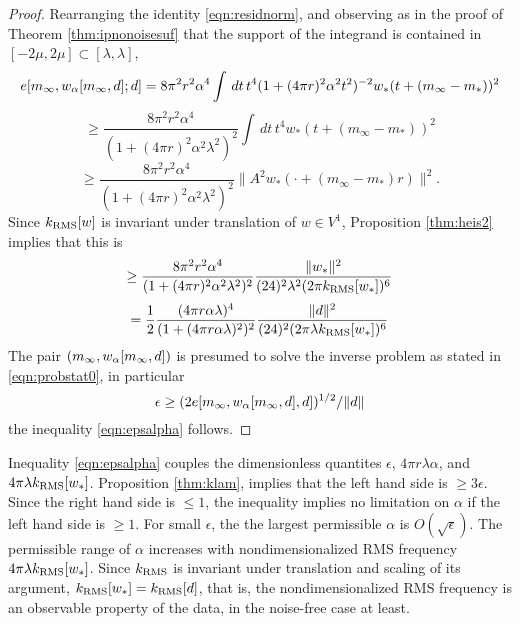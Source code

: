 \begin{proof}
  Rearranging the identity \ref{eqn:residnorm}, and observing as in
  the proof of Theorem \ref{thm:ipnonoisesuf} that the support of the
  integrand is contained in $[-2\mu, 2\mu] \subset [\lambda,\lambda]$,
  \[
  e[m_{\infty},w_{\alpha}[m_{\infty},d];d] 
= 8 \pi^2 r^2 \alpha^4\int\,dt\,t^4(1+(4\pi r)^2 \alpha^2 t^2)^{-2}w_*(t+(m_{\infty}-m_*))^2
\]
\[
  \ge \frac{8\pi^2r^2\alpha^4}{(1+(4\pi r)^2 \alpha^2
    \lambda^2)^{2}}\int\,dt\,t^4w_*(t+(m_{\infty}-m_*))^2
\]
\begin{equation}
  \label{eqn:residnormbis}
  \ge \frac{8\pi^2r^2\alpha^4}{(1+(4\pi r)^2 \alpha^2
    \lambda^2)^{2}}\|A^2w_*(\cdot + (m_{\infty}-m_*)r)\|^2.
 \end{equation}
Since $k_{\rm RMS}[w]$ is invariant under translation of $w \in V^1$,
Proposition \ref{thm:heis2} implies that this is
\[
  \ge \frac{8\pi^2r^2\alpha^4}{(1+(4\pi r)^2 \alpha^2
    \lambda^2)^{2}}\frac{\|w_*\|^2}{(24)^2 \lambda^2 (2\pi k_{\rm RMS}[w_*])^6}
\]
\[
  = \frac{1}{2}\frac{(4\pi r\alpha\lambda)^4}{(1+(4\pi r \alpha
    \lambda)^2)^{2}}\frac{\|d\|^2}{(24)^2 (2\pi
    \lambda k_{\rm RMS}[w_*])^6}
\]
The pair $(m_{\infty}, w_{\alpha}[m_{\infty},d])$ is presumed to solve the inverse
problem as stated in \ref{eqn:probstat0}, in particular
\[
  \epsilon \ge (2 e[m_{\infty}, w_{\alpha}[m_{\infty},d],d])^{1/2}/\|d\|
\]
the inequality \ref{eqn:epsalpha} follows.

\end{proof}

Inequality \ref{eqn:epsalpha} couples the dimensionless quantites
$\epsilon$,  $4\pi r \lambda \alpha$, and $4 \pi \lambda
k_{\rm RMS}[w_*]$. Proposition \ref{thm:klam}, implies that the left
hand side is $\ge 3\epsilon$. Since the right hand side is $\le 1$,
the inequality implies no limitation on $\alpha$ if the left hand side
is $\ge 1$. For small $\epsilon$, the the largest permissible $\alpha$
is $O(\sqrt{\epsilon})$. The permissible range of $\alpha$ increases with
nondimensionalized RMS frequency $4\pi \lambda k_{\rm RMS}[w_*]$. Since
$k_{\rm RMS}$ is invariant under translation and scaling of its argument,
$k_{\rm RMS}[w_*]=k_{\rm RMS}[d]$, that is, the nondimensionalized RMS frequency
is an observable property of the data, in the noise-free case at
least.

